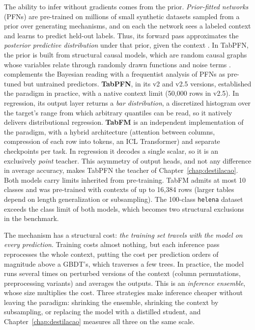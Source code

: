 The ability to infer without gradients comes from the prior.
\emph{Prior-fitted networks} (PFNs) are pre-trained on millions of
small synthetic datasets sampled from a prior over generating mechanisms, and on each the network sees a labeled context and
learns to predict held-out labels. Thus, its forward pass
approximates the \emph{posterior predictive distribution} under that
prior, given the context \citep{muller2022pfn}. In TabPFN, the prior
is built from structural causal models, which are random causal
graphs whose variables relate through randomly drawn functions and
noise terms \citep{hollmann2025}. \citet{nagler2023} complements the
Bayesian reading with a frequentist analysis of PFNs as pre-tuned but
untrained predictors. \textbf{TabPFN}, in its v2
\citep{hollmann2025} and v2.5 \citep{priorlabs2025} versions,
established the paradigm in practice, with a native context limit
(50{,}000 rows in v2.5). In regression, its output layer returns a
\emph{bar distribution}, a discretized histogram over the
target's range from which arbitrary quantiles can be read, so it natively delivers distributional regression. \textbf{TabFM}
\citep{tabfm2026,kong2026} is an independent implementation of the
paradigm, with a hybrid architecture (attention between columns,
compression of each row into tokens, an ICL Transformer) and separate
checkpoints per task. In regression it decodes a single scalar, so it
is an exclusively \emph{point} teacher. This asymmetry of output heads, and not any difference in average accuracy, makes TabPFN the teacher of Chapter~\ref{chap:destilacao}. Both
models carry limits inherited from pre-training. TabFM admits at most
10 classes and was pre-trained with contexts of up to 16{,}384 rows
\citep{kong2026} (larger tables depend on length generalization or subsampling). The 100-class \texttt{helena} dataset exceeds the class
limit of both models, which becomes two structural exclusions in
the benchmark.

The mechanism has a structural cost: \emph{the training set
travels with the model on every prediction}. Training costs almost
nothing, but each inference pass reprocesses the whole context, putting the cost per prediction orders of magnitude above a GBDT's, which traverses a few trees. In practice, the model runs
several times on perturbed versions of the context (column
permutations, preprocessing variants) and averages the outputs. This is an \emph{inference ensemble}, whose size multiplies the cost. Three strategies make inference cheaper without leaving the
paradigm: shrinking the ensemble, shrinking the context by
subsampling, or replacing the model with a distilled student, and Chapter~\ref{chap:destilacao} measures all three on the same scale.

